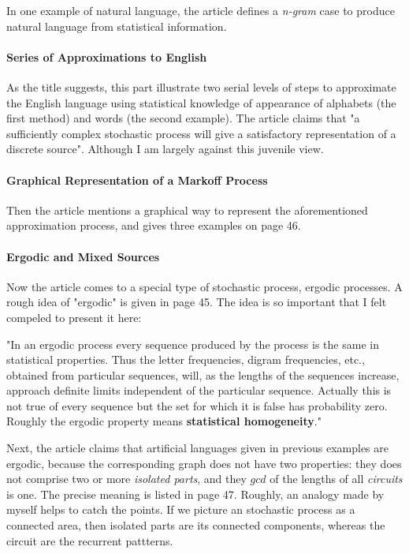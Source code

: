 \documentclass{article}
\numberwithin{equation}{subsection} %
\theoremstyle{definition}
\begin{document}
    In one example of natural language, the article defines a 
    \textit{n-gram} case to produce natural language from statistical
    information.

    \paragraph{Series of Approximations to English}
    As the title suggests, this part illustrate two serial levels of
    steps to approximate the English language using statistical knowledge
    of appearance of alphabets (the first method) and words (the second
    example). The article claims that "a sufficiently complex stochastic 
    process will give a satisfactory representation of a discrete source".
    Although I am largely against this juvenile view.

    \paragraph{Graphical Representation of a Markoff Process}
    Then the article mentions a graphical way to represent the aforementioned
    approximation process, and gives three examples on page 46.

    \paragraph{Ergodic and Mixed Sources}
    Now the article comes to a special type of stochastic process, ergodic
    processes. A rough idea of "ergodic" is given in page 45. The idea is
    so important that I felt compeled to present it here:

    "In an ergodic process every sequence produced by
    the process is the same in statistical properties. Thus the letter
    frequencies, digram frequencies, etc., obtained from particular
    sequences, will, as the lengths of the sequences increase, approach
    definite limits independent of the particular sequence.
    Actually
    this is not true of every sequence but the set for which it is false
    has probability zero. Roughly the ergodic property means 
    \textbf{statistical homogeneity}."

    Next, the article claims that artificial languages given in previous
    examples are ergodic, because the corresponding graph does not
    have two properties: they does not comprise two or more \textit{isolated
    parts}, and they $gcd$ of the lengths of all \textit{circuits }is one.
    The precise meaning is listed in page 47. Roughly, an analogy made by
    myself helps to
    catch the points. If we picture an stochastic process as a connected 
    area, then isolated parts are its connected components, whereas the
    circuit are the recurrent pattterns.
\end{document}
